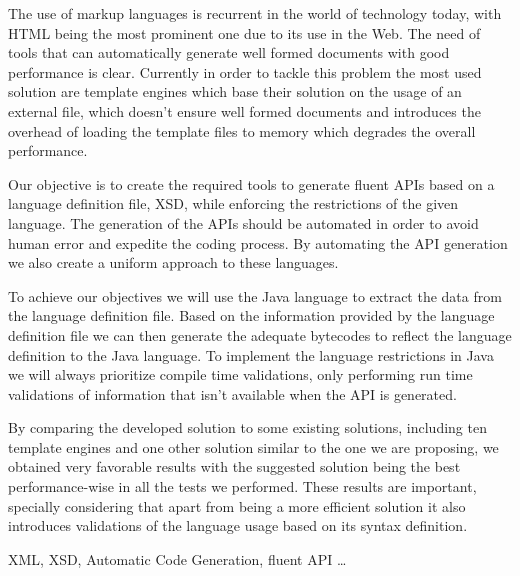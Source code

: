 \abstractEN %

The use of markup languages is recurrent in the world of technology today, with \ac{HTML} being the most prominent one due to its use in the Web. The need of tools that can automatically generate well formed documents with good performance is clear. Currently in order to tackle this problem the most used solution are template engines which base their solution on the usage of an external file, which doesn't ensure well formed documents and introduces the overhead of loading the template files to memory which degrades the overall performance.

\noindent
Our objective is to create the required tools to generate fluent \ac{API}s based on a language definition file, \ac{XSD}, while enforcing the restrictions of the given language. The generation of the \ac{API}s should be automated in order to avoid human error and expedite the coding process. By automating the \ac{API} generation we also create a uniform approach to these languages.  

\noindent
To achieve our objectives we will use the Java language to extract the data from the language definition file. Based on the information provided by the language definition file we can then generate the adequate bytecodes to reflect the language definition to the Java language. To implement the language restrictions in Java we will always prioritize compile time validations, only performing run time validations of information that isn't available when the \ac{API} is generated.

\noindent
By comparing the developed solution to some existing solutions, including ten template engines and one other solution similar to the one we are proposing, we obtained very favorable results with the suggested solution being the best performance-wise in all the tests we performed. These results are important, specially considering that apart from being a more efficient solution it also introduces validations of the language usage based on its syntax definition.

\begin{keywords}
XML, XSD, Automatic Code Generation, fluent API \ldots
\end{keywords} 

